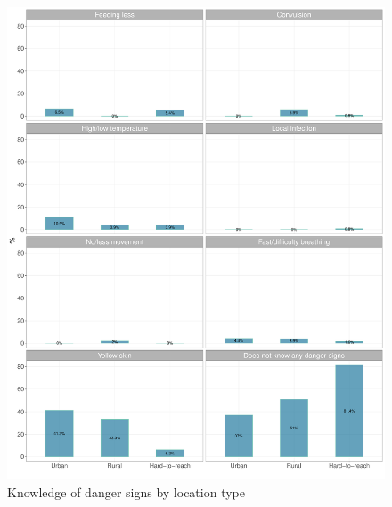 \documentclass[12pt,a4paper]{article}
\begin{document}
\begin{figure}[H]

{\centering \includegraphics{kayahReport_files/figure-latex/nbc7Plot-1} 

}

\caption{Knowledge of danger signs by location type}\label{fig:nbc7Plot}
\end{figure}
\end{document}
